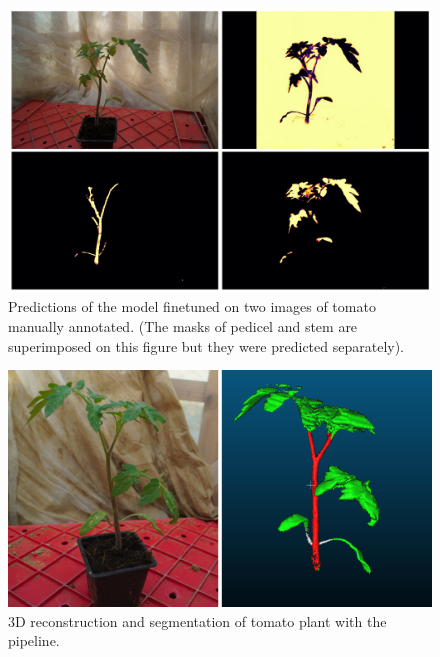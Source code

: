 \begin{figure}[h!]
    \centering \includegraphics[width = \linewidth]{figures/finetune.png}
    \caption{Predictions of the model finetuned on two images of tomato manually annotated. (The masks of pedicel and stem are superimposed on this figure but they were predicted separately).} \label{fig:finetune2D}
\end{figure}


\begin{figure}[h!]
    \centering \includegraphics[width = \linewidth]{figures/tomato.png}
    \caption{3D reconstruction and segmentation of tomato plant with the pipeline.} \label{fig:finetune3D}
\end{figure}


